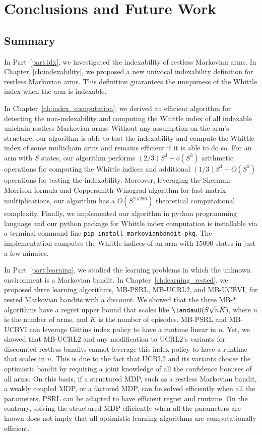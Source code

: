 \begingroup

\let\clearpage\relax

\chapter{Conclusions and Future Work}
\label{chapter:conclusion}

\section{Summary}

In Part~\ref{part:idx}, we investigated the indexability of restless Markovian arms.
In Chapter~\ref{ch:indexability}, we proposed a new univocal indexability definition for restless Markovian arms.
This definition guarantees the uniqueness of the Whittle index when the arm is indexable.

In Chapter~\ref{ch:index_computation}, we derived an efficient algorithm for detecting the non-indexability and computing the Whittle index of all indexable unichain restless Markovian arms.
Without any assumption on the arm's structure, our algorithm is able to test the indexability and compute the Whittle index of some multichain arms and remains efficient if it is able to do so.
For an arm with $S$ states, our algorithm performs $(2/3)S^3+o(S^3)$ arithmetic operations for computing the Whittle indices and additional $(1/3)S^3+O(S^2)$ operations for testing the indexability.
Moreover, leveraging the Sherman-Morrison formula and Coppersmith-Winograd algorithm for fast matrix multiplications, our algorithm has a $O(S^{2.5286})$ theoretical computational complexity.
Finally, we implemented our algorithm in python programming language and our python package for Whittle index computation is installable via a terminal command line \texttt{pip install markovianbandit-pkg}.
The implementation computes the Whittle indices of an arm with $15000$ states in just a few minutes.

In Part~\ref{part:learning}, we studied the learning problems in which the unknown environment is a Markovian bandit.
In Chapter~\ref{ch:learning_rested}, we proposed three learning algorithms, MB-PSRL, MB-UCRL2, and MB-UCBVI, for rested Markovian bandits with a discount.
We showed that the three MB-* algorithms have a regret upper bound that scales like $\tilde{\landauO}(S\sqrt{nK})$, where $n$ is the number of arms, and $K$ is the number of episodes.
MB-PSRL and MB-UCBVI can leverage Gittins index policy to have a runtime linear in $n$. Yet, we showed that MB-UCRL2 and any modification to UCRL2's variants for discounted restless bandits cannot leverage this index policy to have a runtime that scales in $n$.
This is due to the fact that UCRL2 and its variants choose the optimistic bandit by requiring a joint knowledge of all the confidence bonuses of all arms.
On this basis, if a structured MDP, such as a restless Markovian bandit, a weakly coupled MDP, or a factored MDP, can be solved efficiently when all the parameters, PSRL can be adapted to have efficient regret and runtime.
On the contrary, solving the structured MDP efficiently when all the parameters are known does not imply that all optimistic learning algorithms are computationally efficient.

